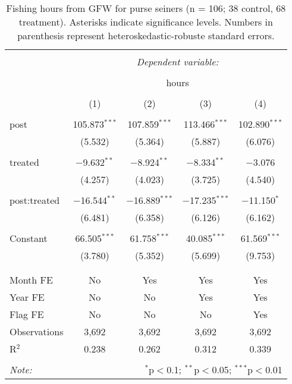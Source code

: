 \documentclass[]{article}
\theoremstyle{definition}
\theoremstyle{definition}
\theoremstyle{definition}
\theoremstyle{remark}
\begin{document}
\begin{table}[!htbp] \centering 
  \caption{\label{tab:purse}Fishing hours from GFW for purse seiners (n = 106; 38 control, 68 treatment). Asterisks indicate significance levels. Numbers in parenthesis represent heteroskedastic-robuste standard errors.} 
  \label{} 
\begin{tabular}{@{\extracolsep{5pt}}lcccc} 
\\[-1.8ex]\hline 
\hline \\[-1.8ex] 
 & \multicolumn{4}{c}{\textit{Dependent variable:}} \\ 
\cline{2-5} 
\\[-1.8ex] & \multicolumn{4}{c}{hours} \\ 
\\[-1.8ex] & (1) & (2) & (3) & (4)\\ 
\hline \\[-1.8ex] 
 post & 105.873$^{***}$ & 107.859$^{***}$ & 113.466$^{***}$ & 102.890$^{***}$ \\ 
  & (5.532) & (5.364) & (5.887) & (6.076) \\ 
  & & & & \\ 
 treated & $-$9.632$^{**}$ & $-$8.924$^{**}$ & $-$8.334$^{**}$ & $-$3.076 \\ 
  & (4.257) & (4.023) & (3.725) & (4.540) \\ 
  & & & & \\ 
 post:treated & $-$16.544$^{**}$ & $-$16.889$^{***}$ & $-$17.235$^{***}$ & $-$11.150$^{*}$ \\ 
  & (6.481) & (6.358) & (6.126) & (6.162) \\ 
  & & & & \\ 
 Constant & 66.505$^{***}$ & 61.758$^{***}$ & 40.085$^{***}$ & 61.569$^{***}$ \\ 
  & (3.780) & (5.352) & (5.699) & (9.753) \\ 
  & & & & \\ 
\hline \\[-1.8ex] 
Month FE & No & Yes & Yes & Yes \\ 
Year FE & No & No & Yes & Yes \\ 
Flag FE & No & No & No & Yes \\ 
Observations & 3,692 & 3,692 & 3,692 & 3,692 \\ 
R$^{2}$ & 0.238 & 0.262 & 0.312 & 0.339 \\ 
\hline 
\hline \\[-1.8ex] 
\textit{Note:}  & \multicolumn{4}{r}{$^{*}$p$<$0.1; $^{**}$p$<$0.05; $^{***}$p$<$0.01} \\ 
\end{tabular} 
\end{table}
\end{document}
